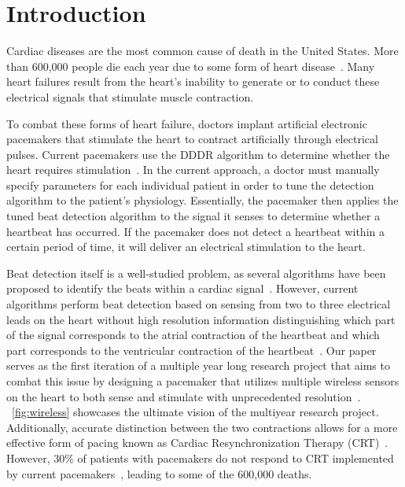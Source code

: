 \documentclass[conference]{IEEEtran}
\begin{document}




%
\IEEEpeerreviewmaketitle



\section{Introduction}
Cardiac diseases are the most common cause of death in
the United States. More than 600,000 people die each year
due to some form of heart disease~\cite{death-stats}.
Many heart failures result from the heart's inability to
generate or to conduct these electrical signals
that stimulate muscle contraction. 

To combat these forms of heart failure, doctors implant artificial electronic pacemakers
that stimulate the heart
to contract artificially through 
electrical pulses.
Current pacemakers use the 
DDDR algorithm to determine whether
the heart requires stimulation~\cite{basic-pacing}.
In the current approach, a doctor must manually specify parameters for each individual patient in order to tune the detection algorithm to the patient's physiology.
Essentially, the pacemaker then applies the tuned beat detection algorithm to the signal it senses
to determine whether a
heartbeat has occurred. If the pacemaker does not detect a heartbeat
within a certain period of time, it will deliver an
electrical stimulation to the heart.

Beat detection itself is a well-studied problem, as
several algorithms have been proposed to identify the
beats within a cardiac signal~\cite{realtime-qrs, ecg-filter, patient-adaptable}. However, current
algorithms perform beat detection based on sensing from two to three electrical leads on the heart without high resolution
information distinguishing which part of the signal corresponds to the atrial
contraction of the heartbeat and which part corresponds to 
the ventricular contraction of the heartbeat~\cite{basic-pacing}. 
Our paper serves as the first iteration of a multiple year long research project that aims to combat this issue by designing
a pacemaker that utilizes multiple wireless sensors on the heart to both sense and stimulate with unprecedented resolution~\cite{rahmani2016fully}.
\figurename~\ref{fig:wireless} showcases the ultimate vision of the multiyear research project.
Additionally, accurate distinction between the two contractions allows for a more effective form of pacing known as
Cardiac Resynchronization Therapy (CRT)~\cite{multisite-crt}.
However,  30\% of patients with pacemakers do 
not respond to CRT implemented by current pacemakers~\cite{multisite-crt}, leading to some of the 600,000 deaths. 
\end{document}
